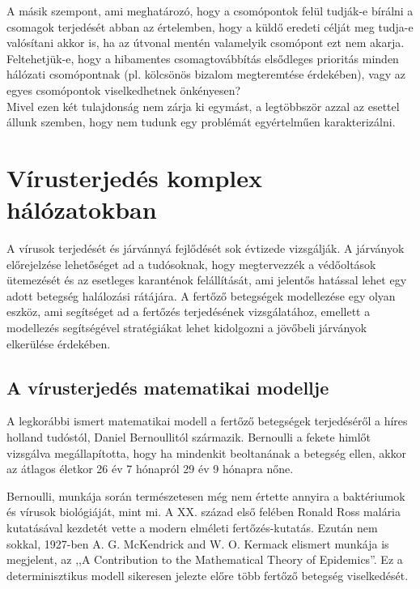 A másik szempont, ami meghatározó, hogy a csomópontok felül tudják-e bírálni a csomagok terjedését abban az értelemben, hogy a küldő eredeti célját meg tudja-e valósítani akkor is, ha az útvonal mentén valamelyik csomópont ezt nem akarja. Feltehetjük-e, hogy a hibamentes csomagtovábbítás elsődleges prioritás minden hálózati csomópontnak (pl. kölcsönös bizalom megteremtése érdekében), vagy az egyes csomópontok viselkedhetnek önkényesen?\\

Mivel ezen két tulajdonság nem zárja ki egymást, a legtöbbször azzal az esettel állunk szemben, hogy nem tudunk egy problémát egyértelműen karakterizálni.

  \section{Vírusterjedés komplex hálózatokban}
  A vírusok terjedését és járvánnyá fejlődését sok évtizede vizsgálják. A járványok előrejelzése lehetőséget ad a tudósoknak, hogy megtervezzék a védőoltások ütemezését és az esetleges karanténok felállítását, ami jelentős hatással lehet egy adott betegség halálozási rátájára. A fertőző betegségek modellezése egy olyan eszköz, ami segítséget ad a fertőzés terjedésének vizsgálatához, emellett a modellezés segítségével stratégiákat lehet kidolgozni a jövőbeli járványok elkerülése érdekében\cite{Epidemic_Modelling_An_Introduction}.

    \subsection{A vírusterjedés matematikai modellje}
    A legkorábbi ismert matematikai modell a fertőző betegségek terjedéséről a híres holland tudóstól, Daniel Bernoullitól származik. Bernoulli a fekete himlőt vizsgálva megállapította, hogy ha mindenkit beoltanának a betegség ellen, akkor az átlagos életkor 26 év 7 hónapról 29 év 9 hónapra nőne\cite{Bernoulli_Blower}.

    Bernoulli, munkája során természetesen még nem értette annyira a baktériumok és vírusok biológiáját, mint mi. A XX. század első felében Ronald Ross malária kutatásával kezdetét vette a modern elméleti fertőzés-kutatás. Ezután nem sokkal, 1927-ben A. G. McKendrick and W. O. Kermack elismert munkája is megjelent, az ,,A Contribution to the Mathematical Theory of Epidemics''. Ez a determinisztikus modell sikeresen jelezte előre több fertőző betegség viselkedését.\\

